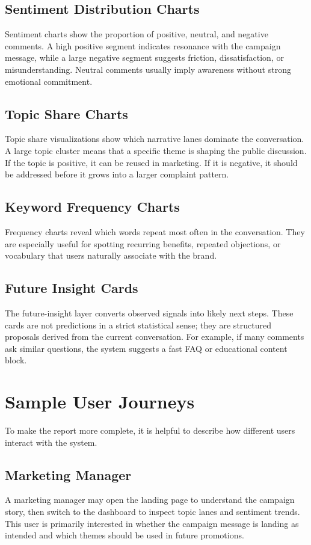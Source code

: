 \subsection{Sentiment Distribution Charts}
Sentiment charts show the proportion of positive, neutral, and negative comments. A high positive segment indicates resonance with the campaign message, while a large negative segment suggests friction, dissatisfaction, or misunderstanding. Neutral comments usually imply awareness without strong emotional commitment.

\subsection{Topic Share Charts}
Topic share visualizations show which narrative lanes dominate the conversation. A large topic cluster means that a specific theme is shaping the public discussion. If the topic is positive, it can be reused in marketing. If it is negative, it should be addressed before it grows into a larger complaint pattern.

\subsection{Keyword Frequency Charts}
Frequency charts reveal which words repeat most often in the conversation. They are especially useful for spotting recurring benefits, repeated objections, or vocabulary that users naturally associate with the brand.

\subsection{Future Insight Cards}
The future-insight layer converts observed signals into likely next steps. These cards are not predictions in a strict statistical sense; they are structured proposals derived from the current conversation. For example, if many comments ask similar questions, the system suggests a fast FAQ or educational content block.

\section{Sample User Journeys}
To make the report more complete, it is helpful to describe how different users interact with the system.

\subsection{Marketing Manager}
A marketing manager may open the landing page to understand the campaign story, then switch to the dashboard to inspect topic lanes and sentiment trends. This user is primarily interested in whether the campaign message is landing as intended and which themes should be used in future promotions.

